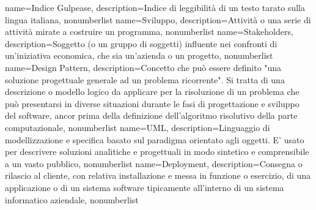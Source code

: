 {
	name={Indice Gulpease},
	description={Indice di leggibilità di un testo tarato sulla lingua italiana},
	nonumberlist
}
{
	name={Sviluppo},
	description={Attività o una serie di attività mirate a costruire un programma},
	nonumberlist
}
{
	name={Stakeholders},
	description={Soggetto (o un gruppo di soggetti) influente nei confronti di un'iniziativa economica, che sia un'azienda o un progetto},
	nonumberlist
}
{
	name={Design Pattern},
	description={Concetto che può essere definito "una soluzione progettuale generale ad un problema ricorrente". Si tratta di una descrizione o modello logico da applicare per la risoluzione di un problema che può presentarsi in diverse situazioni durante le fasi di progettazione e sviluppo del software, ancor prima della definizione dell'algoritmo risolutivo della parte computazionale},
	nonumberlist
}
{
	name={UML},
	description={Linguaggio di modellizzazione e specifica basato sul paradigma orientato agli oggetti. E' usato per descrivere soluzioni analitiche e progettuali in modo sintetico e comprensibile a un vasto pubblico},
	nonumberlist
}
{
	name={Deployment},
	description={Consegna o rilascio al cliente, con relativa installazione e messa in funzione o esercizio, di una applicazione o di un sistema software tipicamente all'interno di un sistema informatico aziendale},
	nonumberlist
}

